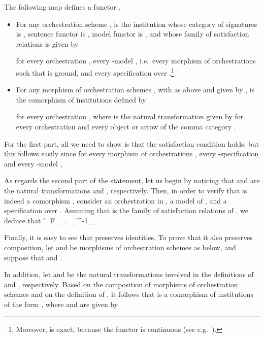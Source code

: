 \documentclass{LMCS}
\begin{document}
  \begin{thm}
    \label{theorem:osIns}
    The following map defines a functor .
    \begin{itemize}

    \item For any orchestration scheme ,  is the institution whose category of signatures is , sentence functor is , model functor is , and whose family of satisfaction relations is given by
      
      for every orchestration , every \nb-model , i.e.\ every morphism of orchestrations  such that  is ground, and every specification  over .\footnote{Moreover,  is exact, because the functor  is continuous (see e.g.~\cite{Meseguer:General-logics-1989}).}

    \item For any morphism of orchestration schemes , with  as above and  given by ,  is the comorphism of institutions  defined by
      
      for every orchestration , where  is the natural transformation given by  for every orchestration  and every object or arrow  of the comma category .

    \end{itemize}
  \end{thm}

  \proof
  For the first part, all we need to show is that the satisfaction condition holds; but this follows easily since for every morphism of orchestrations , every \nb-specification  and every \nb-model ,
  

  As regards the second part of the statement, let us begin by noticing that  and  are the natural transformations  and , respectively.
  Then, in order to verify that  is indeed a comorphism , consider an orchestration  in , a model  of , and a specification  over .
  Assuming that  is the family of satisfaction relations of , we deduce that
  \models'_{F\rbr{\orc}}\alpha_{\orc}\sigma\Prop{} = \sigma_{\grc'}^{-1}\models_{\orc}\beta_{\orc}

\noindent  Finally, it is easy to see that  preserves identities.
  To prove that it also preserves composition, let  and  be  morphisms of orchestration schemes as below, and suppose that  and .
  
  In addition, let  and  be the natural transformations involved in the definitions of  and , respectively.
  Based on the composition of morphisms of orchestration schemes and on the definition of , it follows that  is a comorphism of institutions of the form , where  and  are given by
  
\end{document}
